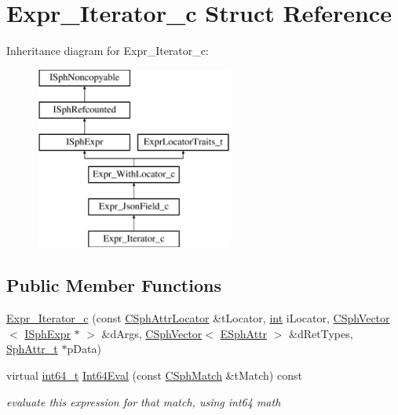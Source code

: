 \hypertarget{structExpr__Iterator__c}{\section{Expr\-\_\-\-Iterator\-\_\-c Struct Reference}
\label{structExpr__Iterator__c}
}
Inheritance diagram for Expr\-\_\-\-Iterator\-\_\-c\-:\begin{figure}[H]
\begin{center}
\leavevmode
\includegraphics[height=6.000000cm]{structExpr__Iterator__c}
\end{center}
\end{figure}
\subsection*{Public Member Functions}
\begin{DoxyCompactItemize}
\item 
\hyperlink{structExpr__Iterator__c_abedf252d29ae11907e57ae8ab1aab6d8}{Expr\-\_\-\-Iterator\-\_\-c} (const \hyperlink{structCSphAttrLocator}{C\-Sph\-Attr\-Locator} \&t\-Locator, \hyperlink{sphinxexpr_8cpp_a4a26e8f9cb8b736e0c4cbf4d16de985e}{int} i\-Locator, \hyperlink{classCSphVector}{C\-Sph\-Vector}$<$ \hyperlink{structISphExpr}{I\-Sph\-Expr} $\ast$ $>$ \&d\-Args, \hyperlink{classCSphVector}{C\-Sph\-Vector}$<$ \hyperlink{sphinxexpr_8h_aa883df0db2e4468a107fdd2d2ae625a3}{E\-Sph\-Attr} $>$ \&d\-Ret\-Types, \hyperlink{sphinx_8h_a7c122d91b0b52a0214ba176636bb1561}{Sph\-Attr\-\_\-t} $\ast$p\-Data)
\item 
virtual \hyperlink{sphinxstd_8h_a996e72f71b11a5bb8b3b7b6936b1516d}{int64\-\_\-t} \hyperlink{structExpr__Iterator__c_a0ce1d42d09b500bf6c046266ba6d24c1}{Int64\-Eval} (const \hyperlink{classCSphMatch}{C\-Sph\-Match} \&t\-Match) const 
\begin{DoxyCompactList}\small\item\em evaluate this expression for that match, using int64 math \end{DoxyCompactList}\end{DoxyCompactItemize}
